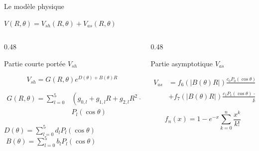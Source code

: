 \documentclass[10pt, aspectratio=169]{beamer}
\begin{document}
\begin{frame}{Le modèle physique}

\begin{center}
$\boxed{V(R,\theta)=V_{sh}(R,\theta)+V_{as}(R,\theta)}$
\end{center}


\begin{columns}[T]

\begin{column}{0.48\textwidth\small}

\begin{block}{Partie courte portée $V_{sh}$}

\[V_{sh}=G(R,\theta)e^{D(\theta)+B(\theta)R}\]

\begin{align*}
G(R,\theta)=\sum_{l=0}^{5}&
(g_{0,l}+g_{1,l}R+g_{2,l}R^2+g_{3,l}R^3)\\
&P_l(\cos\theta)
\end{align*}

\begin{center}
$D(\theta)=\sum\limits_{l=0}^{5}d_lP_l(\cos\theta)\;$
$\;B(\theta)=\sum\limits_{l=0}^{5}b_lP_l(\cos\theta)$
\end{center}
\begin{center}
\end{center}
\end{block}

\end{column}


\begin{column}{0.48\textwidth\small}

\begin{block}{Partie asymptotique $V_{as}$}

\begin{align*}
  V_{as}&=f_6(\lvert B(\theta)R\rvert)
  \frac{c_0P_0(\cos\theta)+c_2P_2(\cos\theta)}{R^6}\\
  &+f_7(\lvert B(\theta)R\rvert)\frac{c_1P_1(\cos\theta)+c_3P_3(\cos\theta)}{R^7}
\end{align*}

\[f_n(x)=1-e^{-x}\sum_{k=0}^{n}\frac{x^k}{k!}\]

\end{block}

\end{column}

\end{columns}

\end{frame}
\end{document}

